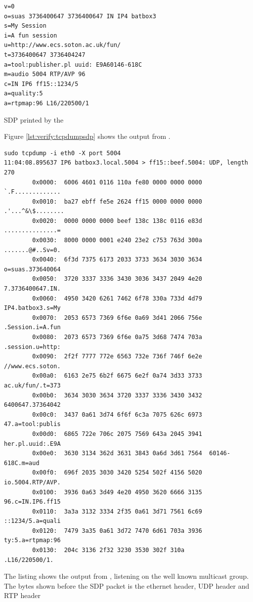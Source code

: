 \begin{listing}[H] 
\begin{verbatim}
v=0
o=suas 3736400647 3736400647 IN IP4 batbox3
s=My Session
i=A fun session
u=http://www.ecs.soton.ac.uk/fun/
t=3736400647 3736404247
a=tool:publisher.pl uuid: E9A60146-618C
m=audio 5004 RTP/AVP 96
c=IN IP6 ff15::1234/5
a=quality:5
a=rtpmap:96 L16/220500/1
\end{verbatim}
\caption{SDP printed by the \pub{}}
\label{lst:verify:sdp}
\end{listing}

Figure \ref{lst:verify:tcpdumpsdp} shows the output from .

\begin{listing}[H] 
	\begin{verbatim}
sudo tcpdump -i eth0 -X port 5004
11:04:08.895637 IP6 batbox3.local.5004 > ff15::beef.5004: UDP, length 270
        0x0000:  6006 4601 0116 110a fe80 0000 0000 0000  `.F.............
        0x0010:  ba27 ebff fe5e 2624 ff15 0000 0000 0000  .'...^&\$........
        0x0020:  0000 0000 0000 beef 138c 138c 0116 e83d  ...............=
        0x0030:  8000 0000 0001 e240 23e2 c753 763d 300a  .......@#..Sv=0.
        0x0040:  6f3d 7375 6173 2033 3733 3634 3030 3634  o=suas.373640064
        0x0050:  3720 3337 3336 3430 3036 3437 2049 4e20  7.3736400647.IN.
        0x0060:  4950 3420 6261 7462 6f78 330a 733d 4d79  IP4.batbox3.s=My
        0x0070:  2053 6573 7369 6f6e 0a69 3d41 2066 756e  .Session.i=A.fun
        0x0080:  2073 6573 7369 6f6e 0a75 3d68 7474 703a  .session.u=http:
        0x0090:  2f2f 7777 772e 6563 732e 736f 746f 6e2e  //www.ecs.soton.
        0x00a0:  6163 2e75 6b2f 6675 6e2f 0a74 3d33 3733  ac.uk/fun/.t=373
        0x00b0:  3634 3030 3634 3720 3337 3336 3430 3432  6400647.37364042
        0x00c0:  3437 0a61 3d74 6f6f 6c3a 7075 626c 6973  47.a=tool:publis
        0x00d0:  6865 722e 706c 2075 7569 643a 2045 3941  her.pl.uuid:.E9A
        0x00e0:  3630 3134 362d 3631 3843 0a6d 3d61 7564  60146-618C.m=aud
        0x00f0:  696f 2035 3030 3420 5254 502f 4156 5020  io.5004.RTP/AVP.
        0x0100:  3936 0a63 3d49 4e20 4950 3620 6666 3135  96.c=IN.IP6.ff15
        0x0110:  3a3a 3132 3334 2f35 0a61 3d71 7561 6c69  ::1234/5.a=quali
        0x0120:  7479 3a35 0a61 3d72 7470 6d61 703a 3936  ty:5.a=rtpmap:96
        0x0130:  204c 3136 2f32 3230 3530 302f 310a       .L16/220500/1.
	\end{verbatim}
\caption{The listing shows the output from , listening on the well known multicast group. The bytes shown before the SDP packet is the ethernet header, UDP header and RTP header}
\label{lst:verify:tcpdumpsdp}
\end{listing}

